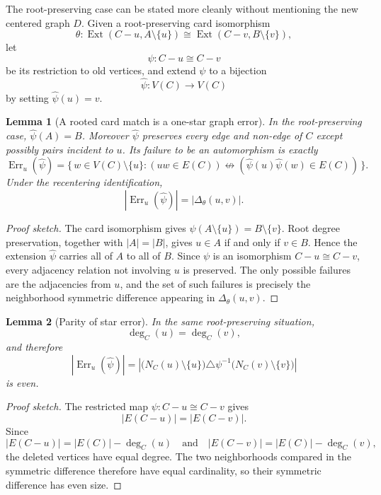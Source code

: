 \documentclass[11pt]{article}
\newtheorem{lemma}{Lemma}
\newcommand{\Ext}{\operatorname{Ext}}
\newcommand{\Err}{\operatorname{Err}}
\begin{document}
The root-preserving case can be stated more cleanly without mentioning the
new centered graph \(D\).  Given a root-preserving card isomorphism
\[
  \theta:
  \Ext(C-u,A\setminus\{u\})
  \cong
  \Ext(C-v,B\setminus\{v\}),
\]
let
\[
  \psi:C-u\cong C-v
\]
be its restriction to old vertices, and extend \(\psi\) to a bijection
\[
  \widehat\psi:V(C)\to V(C)
\]
by setting \(\widehat\psi(u)=v\).

\begin{lemma}[A rooted card match is a one-star graph error]
In the root-preserving case, \(\widehat\psi(A)=B\).  Moreover
\(\widehat\psi\) preserves every edge and non-edge of \(C\) except possibly
pairs incident to \(u\).  Its failure to be an automorphism is exactly
\[
  \Err_u(\widehat\psi)
  =
  \{\,w\in V(C)\setminus\{u\} :
      (uw\in E(C))
      \not\leftrightarrow
      (\widehat\psi(u)\widehat\psi(w)\in E(C))
  \,\}.
\]
Under the recentering identification,
\[
  |\Err_u(\widehat\psi)| = |\Delta_\theta(u,v)|.
\]
\end{lemma}

\begin{proof}[Proof sketch]
The card isomorphism gives
\(\psi(A\setminus\{u\})=B\setminus\{v\}\).  Root degree preservation, together
with \(|A|=|B|\), gives \(u\in A\) if and only if \(v\in B\).  Hence the
extension \(\widehat\psi\) carries all of \(A\) to all of \(B\).  Since
\(\psi\) is an isomorphism \(C-u\cong C-v\), every adjacency relation not
involving \(u\) is preserved.  The only possible failures are the adjacencies
from \(u\), and the set of such failures is precisely the neighborhood
symmetric difference appearing in \(\Delta_\theta(u,v)\).
\end{proof}

\begin{lemma}[Parity of star error]
In the same root-preserving situation,
\[
  \deg_C(u)=\deg_C(v),
\]
and therefore
\[
  |\Err_u(\widehat\psi)|
  =
  \left|
    \bigl(N_C(u)\setminus\{u\}\bigr)
    \triangle
    \psi^{-1}\bigl(N_C(v)\setminus\{v\}\bigr)
  \right|
\]
is even.
\end{lemma}

\begin{proof}[Proof sketch]
The restricted map \(\psi:C-u\cong C-v\) gives
\[
  |E(C-u)|=|E(C-v)|.
\]
Since
\[
  |E(C-u)|=|E(C)|-\deg_C(u)
  \quad\text{and}\quad
  |E(C-v)|=|E(C)|-\deg_C(v),
\]
the deleted vertices have equal degree.  The two neighborhoods compared in
the symmetric difference therefore have equal cardinality, so their symmetric
difference has even size.
\end{proof}
\end{document}

